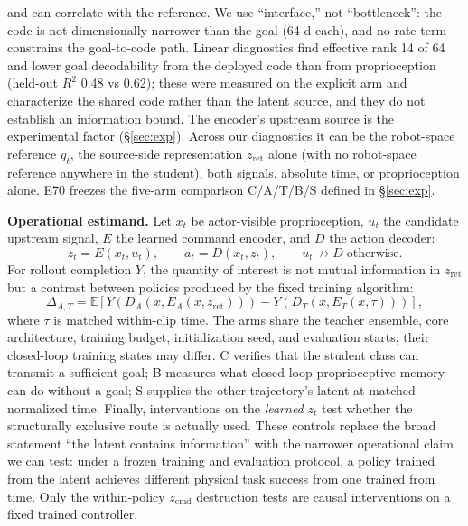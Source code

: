 \documentclass[conference]{IEEEtran}
\newcommand{\zcmd}{\ensuremath{z_{\mathrm{cmd}}}}
\begin{document}
and can correlate with the reference.  We use ``interface,'' not ``bottleneck'': the code is
not dimensionally narrower than the goal (64-d each), and no rate term constrains the
goal-to-code path. Linear diagnostics find effective rank 14 of 64 and lower goal
decodability from the deployed code than from proprioception (held-out $R^2$ 0.48 vs
0.62); these were measured on the explicit arm and characterize the shared code rather
than the latent source, and they do not establish an information
bound.
The encoder's upstream source is the experimental factor (\S\ref{sec:exp}).  Across our
diagnostics it can be the robot-space reference $g_t$, the source-side representation
$z_{\mathrm{ret}}$ alone (with no robot-space reference anywhere in the student), both
signals, absolute time, or proprioception alone.  E70 freezes the five-arm comparison
C/A/T/B/S defined in \S\ref{sec:exp}.

\textbf{Operational estimand.}  Let $x_t$ be actor-visible proprioception, $u_t$ the
candidate upstream signal, $E$ the learned command encoder, and $D$ the action decoder:
\begin{equation}
  z_t=E(x_t,u_t), \qquad a_t=D(x_t,z_t), \qquad u_t\not\rightarrow D\;\text{otherwise}.
\end{equation}
For rollout completion $Y$, the quantity of interest is not mutual information in
$z_{\mathrm{ret}}$ but a contrast between policies produced by the fixed training
algorithm:
\begin{equation}
  \Delta_{A,T}=\mathbb{E}[Y(D_A(x,E_A(x,z_{\mathrm{ret}})))-
  Y(D_T(x,E_T(x,\tau)))],
\end{equation}
where $\tau$ is matched within-clip time.  The arms share the
teacher ensemble, core architecture, training budget, initialization seed, and
evaluation starts; their closed-loop training states may differ.  C verifies
that the student class can transmit a sufficient goal; B measures what closed-loop
proprioceptive memory can do without a goal; S supplies the other trajectory's latent at
matched normalized time.  Finally, interventions on the
\emph{learned} $z_t$ test whether the structurally exclusive route is actually used.
These controls replace the broad statement ``the latent contains information'' with the
narrower operational claim we can test: under a frozen training and evaluation protocol,
a policy trained from the latent achieves different physical task success from one
trained from time.  Only the within-policy \zcmd{} destruction tests are causal
interventions on a fixed trained controller.
\end{document}
